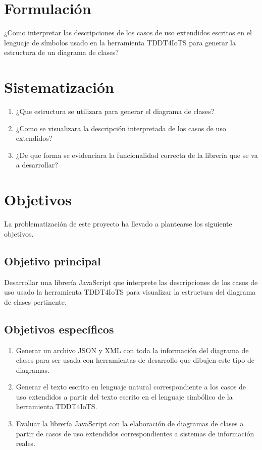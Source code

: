\documentclass[12pt, openany, xcolor=table]{book}
\begin{document}
	\section{Formulación}
	
	¿Como interpretar las descripciones de los casos de uso extendidos escritos en el lenguaje de símbolos usado en la herramienta TDDT4IoTS para generar la estructura de un diagrama de clases?
	
	\section{Sistematización}
	
	\begin{enumerate}
		\item ¿Que estructura se utilizara para generar el diagrama de clases?
		
		\item ¿Como se visualizara la descripción interpretada de los casos de uso extendidos?
		
		\item ¿De que forma se evidenciara la funcionalidad correcta de la librería que se va a desarrollar?
	\end{enumerate}
	
	\section{Objetivos}
	
	La problematización de este proyecto ha llevado a plantearse los siguiente objetivos.
	
	\subsection{Objetivo principal}
	
	Desarrollar una librería JavaScript que interprete las descripciones de los casos de uso usado la herramienta TDDT4IoTS para visualizar la estructura del diagrama de clases pertinente. 
	
	\subsection{Objetivos específicos}
	
	\begin{enumerate}
		
		\item Generar un archivo JSON y XML con toda la información del
		diagrama de clases para ser usada con herramientas de desarrollo que dibujen este tipo de diagramas.
		
		\item Generar el texto escrito en lenguaje natural correspondiente a los casos de uso extendidos a partir del texto escrito en el lenguaje simbólico de la herramienta TDDT4IoTS.
		
		\item Evaluar la librería JavaScript con la elaboración de diagramas de clases a partir de casos de uso extendidos correspondientes a sistemas de información reales.
	\end{enumerate}
	
\end{document}
